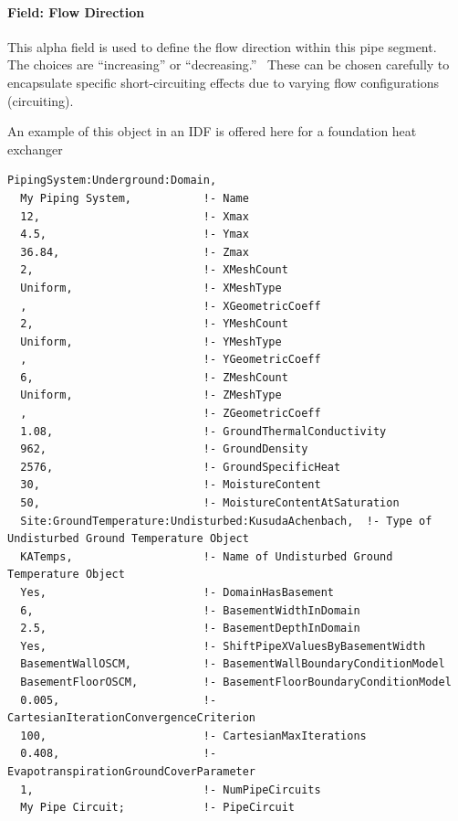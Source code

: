 \paragraph{Field: Flow Direction}\label{field-flow-direction}

This alpha field is used to define the flow direction within this pipe segment.~ The choices are ``increasing'' or ``decreasing.''~ These can be chosen carefully to encapsulate specific short-circuiting effects due to varying flow configurations (circuiting).

An example of this object in an IDF is offered here for a foundation heat exchanger

\begin{lstlisting}
PipingSystem:Underground:Domain,
  My Piping System,           !- Name
  12,                         !- Xmax
  4.5,                        !- Ymax
  36.84,                      !- Zmax
  2,                          !- XMeshCount
  Uniform,                    !- XMeshType
  ,                           !- XGeometricCoeff
  2,                          !- YMeshCount
  Uniform,                    !- YMeshType
  ,                           !- YGeometricCoeff
  6,                          !- ZMeshCount
  Uniform,                    !- ZMeshType
  ,                           !- ZGeometricCoeff
  1.08,                       !- GroundThermalConductivity
  962,                        !- GroundDensity
  2576,                       !- GroundSpecificHeat
  30,                         !- MoistureContent
  50,                         !- MoistureContentAtSaturation
  Site:GroundTemperature:Undisturbed:KusudaAchenbach,  !- Type of Undisturbed Ground Temperature Object
  KATemps,                    !- Name of Undisturbed Ground Temperature Object
  Yes,                        !- DomainHasBasement
  6,                          !- BasementWidthInDomain
  2.5,                        !- BasementDepthInDomain
  Yes,                        !- ShiftPipeXValuesByBasementWidth
  BasementWallOSCM,           !- BasementWallBoundaryConditionModel
  BasementFloorOSCM,          !- BasementFloorBoundaryConditionModel
  0.005,                      !- CartesianIterationConvergenceCriterion
  100,                        !- CartesianMaxIterations
  0.408,                      !- EvapotranspirationGroundCoverParameter
  1,                          !- NumPipeCircuits
  My Pipe Circuit;            !- PipeCircuit


\end{lstlisting}
